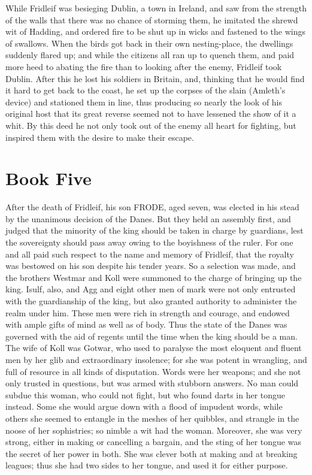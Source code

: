 \documentclass[10pt,a4paper]{report}
\begin{document}
While Fridleif was besieging Dublin, a town in Ireland, and saw from the strength of the walls that there was no chance of storming them, he imitated the shrewd wit of Hadding, and ordered fire to be shut up in wicks and fastened to the wings of swallows. When the birds got back in their own nesting-place, the dwellings suddenly flared up; and while the citizens all ran up to quench them, and paid more heed to abating the fire than to looking after the enemy, Fridleif took Dublin. After this he lost his soldiers in Britain, and, thinking that he would find it hard to get back to the coast, he set up the corpses of the slain (Amleth's device) and stationed them in line, thus producing so nearly the look of his original host that its great reverse seemed not to have lessened the show of it a whit. By this deed he not only took out of the enemy all heart for fighting, but inspired them with the desire to make their escape.\\


\chapter{Book Five}

After the death of Fridleif, his son FRODE, aged seven, was elected in his stead by the unanimous decision of the Danes. But they held an assembly first, and judged that the minority of the king should be taken in charge by guardians, lest the sovereignty should pass away owing to the boyishness of the ruler. For one and all paid such respect to the name and memory of Fridleif, that the royalty was bestowed on his son despite his tender years. So a selection was made, and the brothers Westmar and Koll were summoned to the charge of bringing up the king. Isulf, also, and Agg and eight other men of mark were not only entrusted with the guardianship of the king, but also granted authority to administer the realm under him. These men were rich in strength and courage, and endowed with ample gifts of mind as well as of body. Thus the state of the Danes was governed with the aid of regents until the time when the king should be a man.\\

The wife of Koll was Gotwar, who used to paralyse the most eloquent and fluent men by her glib and extraordinary insolence; for she was potent in wrangling, and full of resource in all kinds of disputation. Words were her weapons; and she not only trusted in questions, but was armed with stubborn answers. No man could subdue this woman, who could not fight, but who found darts in her tongue instead. Some she would argue down with a flood of impudent words, while others she seemed to entangle in the meshes of her quibbles, and strangle in the noose of her sophistries; so nimble a wit had the woman. Moreover, she was very strong, either in making or cancelling a bargain, and the sting of her tongue was the secret of her power in both. She was clever both at making and at breaking leagues; thus she had two sides to her tongue, and used it for either purpose.\\
\end{document}
